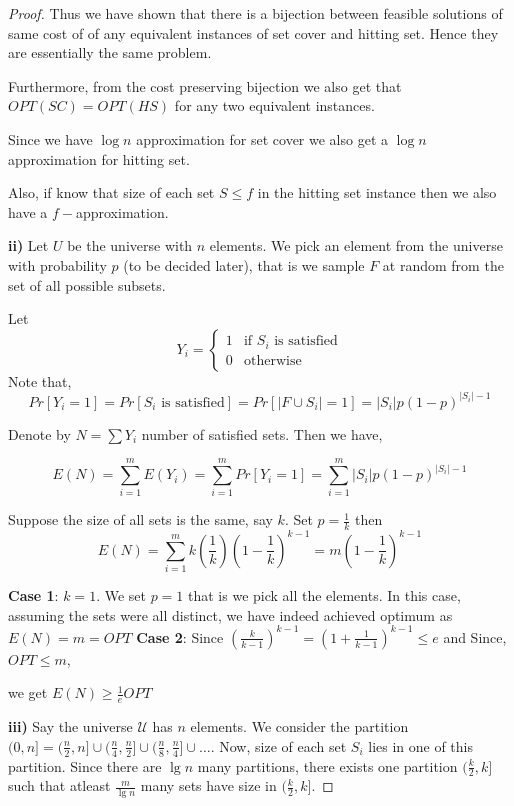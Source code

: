 \documentclass[12pt]{article}
\begin{document}
\begin{proof}
Thus we have shown that there is a bijection between feasible solutions of same cost of of any equivalent instances of set cover and hitting set. Hence they are essentially the same problem. 

Furthermore, from the cost preserving bijection we also get that $OPT(SC) = OPT(HS)$ for any two equivalent instances. 

Since we have $\log n$ approximation for set cover we also get a $\log n$ approximation for hitting set.

Also, if know that size of each set $S \leq f$ in the hitting set instance then we also have a $f-$approximation.

\textbf{ii)} Let $U$ be the universe with $n$ elements. We pick an element from the universe with probability $p$ (to be decided later), that is we sample $F$ at random from the set of all possible subsets.

Let 
$$Y_i =
    \begin{cases}
        1 & \text{if } S_i \text{ is satisfied} \\
        0 & \text{otherwise}
    \end{cases}
$$
Note that, $$Pr[Y_i = 1] = Pr[S_i \text{ is satisfied}] = Pr[|F \cup S_i| = 1] = |S_i|p(1-p)^{|S_i|-1}$$

Denote by $N = \sum Y_i$ number of satisfied sets. Then we have,

$$E(N) = \sum_{i=1}^m E(Y_i) = \sum_{i=1}^m Pr[Y_i = 1] = \sum_{i=1}^m |S_i|p(1-p)^{|S_i|-1}$$

Suppose the size of all sets is the same, say $k$. Set $p = \frac{1}{k}$ then $$E(N) = \sum_{i=1}^m k\left(\frac{1}{k}\right)\left(1-\frac{1}{k}\right)^{k-1} =  m\left(1-\frac{1}{k}\right)^{k-1}$$

\textbf{Case 1}: $k=1$. We set $p=1$ that is we pick all the elements. In this case, assuming the sets were all distinct, we have indeed achieved optimum as $E(N) = m = OPT$
\newline
\newline
\textbf{Case 2}: Since $\left(\frac{k}{k-1}\right)^{k-1} = \left(1+\frac{1}{k-1}\right)^{k-1} \leq e$ and Since, $OPT \leq m$, 

we get $\boxed{E(N) \geq \frac{1}{e} OPT}$

\textbf{iii)} Say the universe $\mathcal{U}$ has $n$ elements. We consider the partition $(0,n] = (\frac{n}{2},n] \cup (\frac{n}{4},\frac{n}{2}] \cup (\frac{n}{8},\frac{n}{4}] \cup \ldots$. Now, size of each set $S_i$ lies in one of this partition. Since there are $\lg n$ many partitions, there exists one partition $(\frac{k}{2},k]$ such that atleast $\frac{m}{\lg n}$ many sets have size in $(\frac{k}{2},k]$.


\end{proof}
\end{document}
